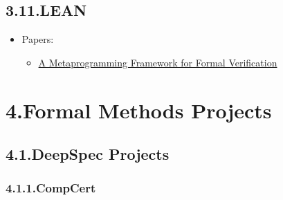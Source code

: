 \documentclass[12pt,twoside]{article}
\begin{document}
\subsection{3.11.\hspace*{0.5em}LEAN}\label{sec-lean}%

\begin{itemize}[noitemsep,topsep=\mdcompacttopsep]%

\item{}Papers:

\begin{itemize}[noitemsep,topsep=\mdcompacttopsep]%

\item{}\href{https://pp.ipd.kit.edu/uploads/publikationen/ebner17meta.pdf}{A Metaprogramming Framework for Formal Verification}%
\end{itemize}%
\end{itemize}%

\section{4.\hspace*{0.5em}Formal Methods Projects}\label{sec-formal-methods-projects}%

\subsection{4.1.\hspace*{0.5em}DeepSpec Projects}\label{sec-deepspec-projects}%

\subsubsection{4.1.1.\hspace*{0.5em}CompCert}\label{sec-compcert}%
\end{document}
